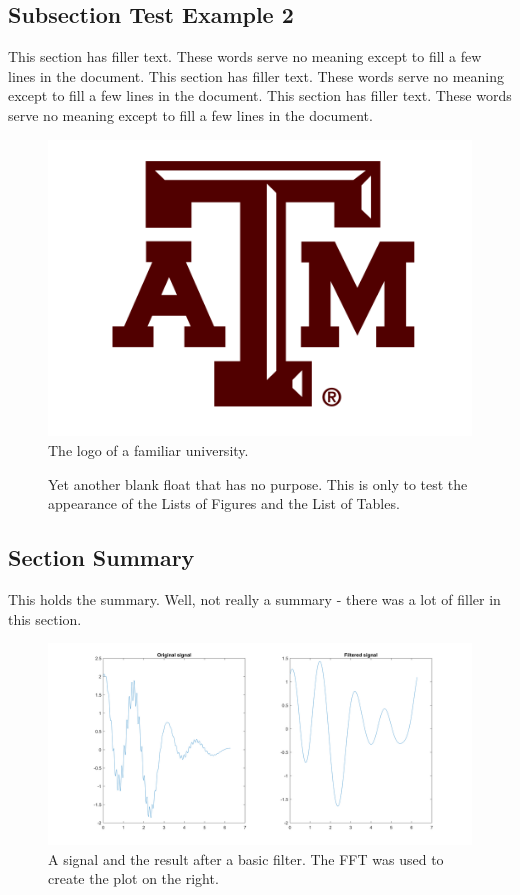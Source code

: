 \subsection{Subsection Test Example 2}
This section has filler text. These words serve no meaning except to fill a few lines in the document. This section has filler text. These words serve no meaning except to fill a few lines in the document. This section has filler text. These words serve no meaning except to fill a few lines in the document.

\begin{figure}[h!]
	\centering
	\includegraphics[scale=0.85]{images/TAM_Logo1.png}
	\caption{The logo of a familiar university.}
\end{figure}

\begin{figure}[!h]
	\caption{Yet another blank float that has no purpose. This is only to test the appearance of the Lists of Figures and the List of Tables.}
\end{figure}

\subsection{Section Summary}

This holds the summary. Well, not really a summary - there was a lot of filler in this section.

\begin{figure}[h!]
	\centering
	\includegraphics[width=6.5in]{images/Filter1.png}
	\caption{A signal and the result after a basic filter. The FFT was used to create the plot on the right.}
\end{figure}

